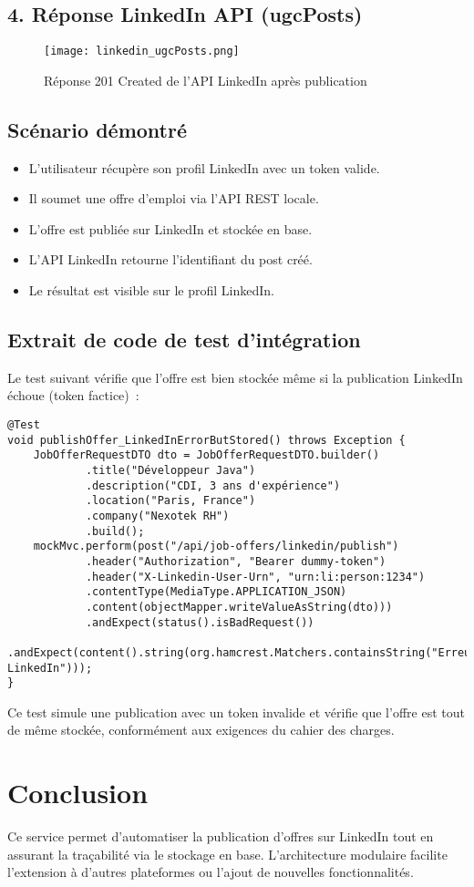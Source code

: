 \documentclass[a4paper,12pt]{report}
\begin{document}
\section{4. Réponse LinkedIn API (ugcPosts)}
\begin{figure}[H]
    \centering
    \texttt{[image: linkedin\_ugcPosts.png]}
    \caption{Réponse 201 Created de l'API LinkedIn après publication}
\end{figure}

\section{Scénario démontré}
\begin{itemize}[leftmargin=*]
    \item L'utilisateur récupère son profil LinkedIn avec un token valide.
    \item Il soumet une offre d'emploi via l'API REST locale.
    \item L'offre est publiée sur LinkedIn et stockée en base.
    \item L'API LinkedIn retourne l'identifiant du post créé.
    \item Le résultat est visible sur le profil LinkedIn.
\end{itemize}

\section{Extrait de code de test d'intégration}
Le test suivant vérifie que l'offre est bien stockée même si la publication LinkedIn échoue (token factice) :

\begin{verbatim}
@Test
void publishOffer_LinkedInErrorButStored() throws Exception {
    JobOfferRequestDTO dto = JobOfferRequestDTO.builder()
            .title("Développeur Java")
            .description("CDI, 3 ans d'expérience")
            .location("Paris, France")
            .company("Nexotek RH")
            .build();
    mockMvc.perform(post("/api/job-offers/linkedin/publish")
            .header("Authorization", "Bearer dummy-token")
            .header("X-Linkedin-User-Urn", "urn:li:person:1234")
            .contentType(MediaType.APPLICATION_JSON)
            .content(objectMapper.writeValueAsString(dto)))
            .andExpect(status().isBadRequest())
            .andExpect(content().string(org.hamcrest.Matchers.containsString("Erreur LinkedIn")));
}
\end{verbatim}

\noindent
Ce test simule une publication avec un token invalide et vérifie que l'offre est tout de même stockée, conformément aux exigences du cahier des charges.

\chapter*{Conclusion}
\thispagestyle{plain}
Ce service permet d'automatiser la publication d'offres sur LinkedIn tout en assurant la traçabilité via le stockage en base. L'architecture modulaire facilite l'extension à d'autres plateformes ou l'ajout de nouvelles fonctionnalités.
\end{document}
